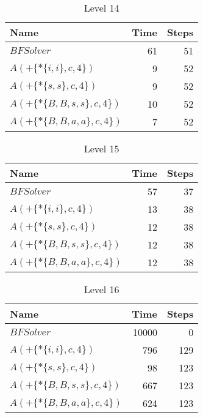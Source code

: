 \begin{table} \centering \begin{tabular}{lrr}\toprule \textbf{ Name }
    & \textbf{ Time } & \textbf{ Steps }\\\midrule
    $BFSolver$ & 61 & 51 \\
    $A(+\{*\{i,i\},c,4\})$ & 9 & 52 \\
    $A(+\{*\{s,s\},c,4\})$ & 9 & 52 \\
    $A(+\{*\{B,B,s,s\},c,4\})$ & 10 & 52 \\
    $A(+\{*\{B,B,a,a\},c,4\})$ & 7 & 52 \\
    \bottomrule \end{tabular} \caption{Level 14}
  \label{tab:level_14} \end{table}

\begin{table} \centering \begin{tabular}{lrr}\toprule \textbf{ Name }
    & \textbf{ Time } & \textbf{ Steps }\\\midrule
    $BFSolver$ & 57 & 37 \\
    $A(+\{*\{i,i\},c,4\})$ & 13 & 38 \\
    $A(+\{*\{s,s\},c,4\})$ & 12 & 38 \\
    $A(+\{*\{B,B,s,s\},c,4\})$ & 12 & 38 \\
    $A(+\{*\{B,B,a,a\},c,4\})$ & 12 & 38 \\
    \bottomrule \end{tabular} \caption{Level 15}
  \label{tab:level_15} \end{table}

\clearpage

\begin{table} \centering \begin{tabular}{lrr}\toprule \textbf{ Name }
    & \textbf{ Time } & \textbf{ Steps }\\\midrule
    $BFSolver$ & 10000 & 0 \\
    $A(+\{*\{i,i\},c,4\})$ & 796 & 129 \\
    $A(+\{*\{s,s\},c,4\})$ & 98 & 123 \\
    $A(+\{*\{B,B,s,s\},c,4\})$ & 667 & 123 \\
    $A(+\{*\{B,B,a,a\},c,4\})$ & 624 & 123 \\
    \bottomrule \end{tabular} \caption{Level 16}
  \label{tab:level_16} \end{table}

